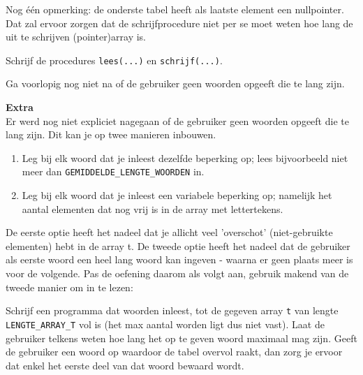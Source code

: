 Nog \'e\'en opmerking: de onderste tabel heeft als laatste element een nullpointer. 
Dat zal ervoor zorgen dat de schrijfprocedure niet per se moet weten hoe lang de uit te schrijven (pointer)array is.

Schrijf de procedures \verb|lees(...)| en \verb|schrijf(...)|.

Ga voorlopig nog niet na of de gebruiker geen woorden opgeeft die te lang zijn.

{\bf Extra}
\\Er werd nog niet expliciet nagegaan of de gebruiker geen woorden opgeeft die te lang zijn. 
Dit kan je op twee manieren inbouwen.
\begin{enumerate}
\item Leg bij elk woord dat je inleest dezelfde beperking op; lees bijvoorbeeld niet meer dan \verb}GEMIDDELDE_LENGTE_WOORDEN} in.
\item Leg bij elk woord dat je inleest een variabele beperking op; namelijk het aantal elementen dat nog vrij is in de array met lettertekens.
\end{enumerate}
De eerste optie heeft het nadeel dat je allicht veel 'overschot' (niet-gebruikte elementen) hebt in de array t. De tweede optie heeft het nadeel
dat de gebruiker als eerste woord een heel lang woord kan ingeven - waarna er geen plaats meer is voor de volgende. Pas de oefening daarom als volgt aan, gebruik makend van de 
tweede manier om in te lezen:

Schrijf een programma dat woorden inleest, tot de gegeven array \verb}t} van lengte \verb}LENGTE_ARRAY_T} vol is (het max aantal worden ligt dus niet vast). Laat de gebruiker telkens weten
hoe lang het op te geven woord maximaal mag zijn. Geeft de gebruiker een woord op waardoor de tabel overvol raakt, 
dan zorg je ervoor dat enkel het eerste deel van dat woord bewaard wordt.
\endoef
